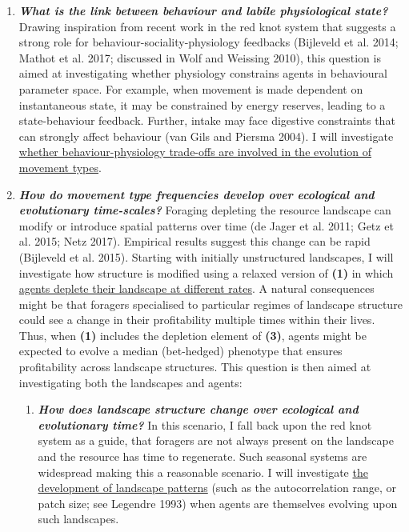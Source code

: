 \documentclass[]{scrartcl}
\begin{document}
\begin{linenumbers}
\begin{enumerate}
\item
  
  \emph{\textbf{What is the link between behaviour and labile
  physiological state?}} Drawing inspiration from recent work in the red
  knot system that suggests a strong role for
  behaviour-sociality-physiology feedbacks (Bijleveld et al. 2014;
  Mathot et al. 2017; discussed in Wolf and Weissing 2010), this
  question is aimed at investigating whether physiology constrains
  agents in behavioural parameter space. For example, when movement is
  made dependent on instantaneous state, it may be constrained by energy
  reserves, leading to a state-behaviour feedback. Further, intake may
  face digestive constraints that can strongly affect behaviour (van
  Gils and Piersma 2004). I will investigate \underline{whether
  behaviour-physiology trade-offs are involved in the evolution of
  movement types}.
  
\item
  
  \emph{\textbf{How do movement type frequencies develop over ecological
  and evolutionary time-scales?}} Foraging depleting the resource
  landscape can modify or introduce spatial patterns over time (de Jager
  et al. 2011; Getz et al. 2015; Netz 2017). Empirical results suggest
  this change can be rapid (Bijleveld et al. 2015).
  Starting with initially unstructured landscapes, I will investigate
  how structure is modified using a relaxed version of \textbf{(1)} in
  which \underline{agents deplete their landscape at different rates}. A
  natural consequences might be that foragers specialised to particular
  regimes of landscape structure could see a change in their
  profitability multiple times within their lives. Thus, when
  \textbf{(1)} includes the depletion element of \textbf{(3)}, agents
  might be expected to evolve a median (bet-hedged) phenotype that
  ensures profitability across landscape structures. This question is
  then aimed at investigating both the landscapes and agents:
  

  \begin{enumerate}
  \def\labelenumii{\alph{enumii}.}
  \item
    
    \emph{\textbf{How does landscape structure change over ecological
    and evolutionary time?}} In this scenario, I fall back upon the red
    knot system as a guide, that foragers are not always present on the
    landscape and the resource has time to regenerate. Such seasonal
    systems are widespread making this a reasonable scenario. I will
    investigate \underline{the development of landscape patterns} (such as
    the autocorrelation range, or patch size; see Legendre 1993) when
    agents are themselves evolving upon such landscapes.
    

\end{enumerate}
\end{enumerate}
\end{linenumbers}
\end{document}
